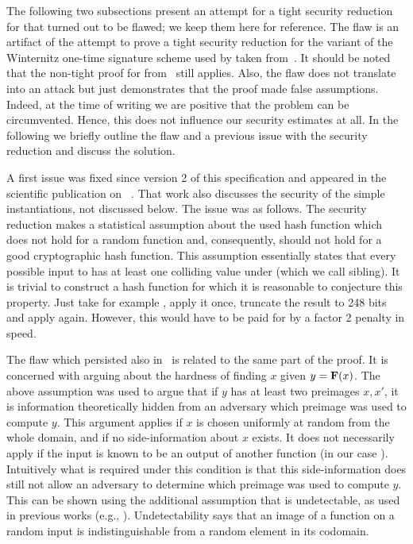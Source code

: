 

The following two subsections present an attempt for a tight security reduction
for \spx that turned out to be flawed; we keep them here for reference. The flaw is
an artifact of the attempt to prove a tight security reduction for the variant
of the Winternitz one-time signature scheme used by \spx taken
from~\cite{Huelsing2016}. It should be noted that the non-tight proof for
\wotsp from~\cite{Hulsing2013} still applies. Also, the flaw does not translate
into an attack but just demonstrates that the proof made false assumptions.
Indeed, at the time of writing we are positive that the problem can be
circumvented. Hence, this does not influence our security estimates at all. In
the following we briefly outline the flaw and a previous issue with the
security reduction and discuss the solution.

A first issue was fixed since version 2 of this specification and appeared in
the scientific publication on \spx~\cite{SPXCCS}. That work also discusses the
security of the simple instantiations, not discussed below. The issue was as
follows.
The security reduction makes a statistical
assumption about the used
hash
function which does not hold for a random function and, consequently, should
not
hold for a good cryptographic hash function. This assumption essentially states
that every possible input to \sphincsF has at least one colliding value under
\sphincsF (which we call sibling).
It is trivial to construct a hash function for which it is reasonable
to conjecture this property. Just take for example \shatwofs, apply it once,
truncate the result to 248 bits and apply \shatwofs again. However, this would
have to be paid for by a factor 2 penalty in speed.

The flaw which persisted also in~\cite{SPXCCS} is related to the
same part of the proof. It is concerned with arguing about the hardness of
finding $x$ given $y = \mathbf{F}(x)$. The above assumption was used to argue
that if $y$ has at least two preimages $x,x'$, it is information
theoretically hidden from an adversary which preimage was used to compute $y$.
This argument applies if $x$ is chosen uniformly at random
from the whole domain, and if no side-information about $x$ exists. It
does not necessarily apply if the input is known to be an output of another
function (in our case \sphincsF). Intuitively what is required under this
condition is that this side-information does still not allow an adversary to
determine which preimage was used to compute $y$. This can be shown using the
additional assumption that \sphincsF is undetectable, as used in previous
works (e.g., \cite{Hulsing2013}). Undetectability says that an image of a
function on a random input is indistinguishable from a random element in its
codomain.

